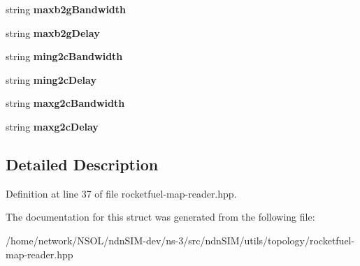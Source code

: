 \begin{DoxyCompactItemize}
\item 
string {\bfseries maxb2g\+Bandwidth}\hypertarget{structns3_1_1RocketfuelParams_adee42f1ff4f230cd0259e2b32399f7c6}{}\label{structns3_1_1RocketfuelParams_adee42f1ff4f230cd0259e2b32399f7c6}

\item 
string {\bfseries maxb2g\+Delay}\hypertarget{structns3_1_1RocketfuelParams_a1b9ecf53e8f2d53a6d7c08b424e5e081}{}\label{structns3_1_1RocketfuelParams_a1b9ecf53e8f2d53a6d7c08b424e5e081}

\item 
string {\bfseries ming2c\+Bandwidth}\hypertarget{structns3_1_1RocketfuelParams_a87a42dac04218e68735322e589c7755f}{}\label{structns3_1_1RocketfuelParams_a87a42dac04218e68735322e589c7755f}

\item 
string {\bfseries ming2c\+Delay}\hypertarget{structns3_1_1RocketfuelParams_af0f690b03e1f3805f94456d005da47c8}{}\label{structns3_1_1RocketfuelParams_af0f690b03e1f3805f94456d005da47c8}

\item 
string {\bfseries maxg2c\+Bandwidth}\hypertarget{structns3_1_1RocketfuelParams_a541a5c8d11b99c308fa0e4cf983138fc}{}\label{structns3_1_1RocketfuelParams_a541a5c8d11b99c308fa0e4cf983138fc}

\item 
string {\bfseries maxg2c\+Delay}\hypertarget{structns3_1_1RocketfuelParams_a0aba51666f66760e3e09f2fe1ab60ef8}{}\label{structns3_1_1RocketfuelParams_a0aba51666f66760e3e09f2fe1ab60ef8}

\end{DoxyCompactItemize}


\subsection{Detailed Description}


Definition at line 37 of file rocketfuel-\/map-\/reader.\+hpp.



The documentation for this struct was generated from the following file\+:\begin{DoxyCompactItemize}
\item 
/home/network/\+N\+S\+O\+L/ndn\+S\+I\+M-\/dev/ns-\/3/src/ndn\+S\+I\+M/utils/topology/rocketfuel-\/map-\/reader.\+hpp\end{DoxyCompactItemize}
